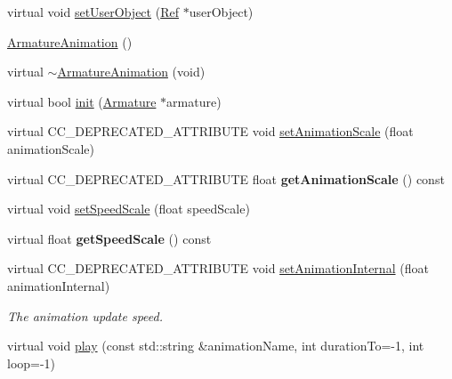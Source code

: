 \begin{DoxyCompactItemize}
\item 
virtual void \hyperlink{classcocostudio_1_1ArmatureAnimation_a6951f6f7fc812995f215ae7c253cc77c}{set\+User\+Object} (\hyperlink{classRef}{Ref} $\ast$user\+Object)
\item 
\hyperlink{classcocostudio_1_1ArmatureAnimation_a9cef53f1f3dabb3023fe2495fc293662}{Armature\+Animation} ()
\item 
virtual \hyperlink{classcocostudio_1_1ArmatureAnimation_a5b5ed9caa6ee7dcc4304c56680dccfff}{$\sim$\+Armature\+Animation} (void)
\item 
virtual bool \hyperlink{classcocostudio_1_1ArmatureAnimation_a04acd23e81652c65fc6bd766135b0eaf}{init} (\hyperlink{classcocostudio_1_1Armature}{Armature} $\ast$armature)
\item 
virtual C\+C\+\_\+\+D\+E\+P\+R\+E\+C\+A\+T\+E\+D\+\_\+\+A\+T\+T\+R\+I\+B\+U\+TE void \hyperlink{classcocostudio_1_1ArmatureAnimation_a86591b66d60783d015712feea1da75c0}{set\+Animation\+Scale} (float animation\+Scale)
\item 
\mbox{\label{classcocostudio_1_1ArmatureAnimation_ab0e8961a4981ba06c5324a062aae5b57}} 
virtual C\+C\+\_\+\+D\+E\+P\+R\+E\+C\+A\+T\+E\+D\+\_\+\+A\+T\+T\+R\+I\+B\+U\+TE float {\bfseries get\+Animation\+Scale} () const
\item 
virtual void \hyperlink{classcocostudio_1_1ArmatureAnimation_aad5972a7b1df053d0606121bc9400a96}{set\+Speed\+Scale} (float speed\+Scale)
\item 
\mbox{\label{classcocostudio_1_1ArmatureAnimation_a9d888f3f8cb09de079945e4ad683d9ca}} 
virtual float {\bfseries get\+Speed\+Scale} () const
\item 
\mbox{\label{classcocostudio_1_1ArmatureAnimation_addff1b98a0343d8afff91ec2244940a1}} 
virtual C\+C\+\_\+\+D\+E\+P\+R\+E\+C\+A\+T\+E\+D\+\_\+\+A\+T\+T\+R\+I\+B\+U\+TE void \hyperlink{classcocostudio_1_1ArmatureAnimation_addff1b98a0343d8afff91ec2244940a1}{set\+Animation\+Internal} (float animation\+Internal)
\begin{DoxyCompactList}\small\item\em The animation update speed. \end{DoxyCompactList}\item 
virtual void \hyperlink{classcocostudio_1_1ArmatureAnimation_acb69125e1aa0d255abf7494dd0b5fac3}{play} (const std\+::string \&animation\+Name, int duration\+To=-\/1, int loop=-\/1)

\end{DoxyCompactItemize}
